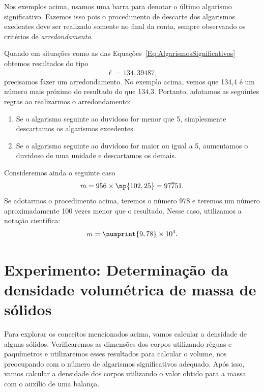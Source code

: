 Nos exemplos acima, usamos uma barra para denotar o último algarismo significativo. Fazemos isso pois o procedimento de descarte dos algarismos exedentes deve ser realizado somente no final da conta, sempre observando os critérios de \emph{arredondamento}.

Quando em situações como as das Equações~\eqref{Eq:AlgarismosSignificativos} obtemos resultados do tipo
\begin{equation}
     \ell = 134{,}\overline{3}9487,
\end{equation}
%
precisamos fazer um arredondamento. No exemplo acima, vemos que 134,4 é um número mais próximo do resultado do que 134,3. Portanto, adotamos as seguintes regras ao realizarmos o arredondamento:
\begin{enumerate}
     \item Se o algarismo seguinte ao duvidoso for menor que 5, simplesmente descartamos os algarismos excedentes.
     \item Se o algarismo seguinte ao duvidoso for maior ou igual a 5, aumentamos o duvidoso de uma unidade e descartamos os demais.
\end{enumerate}

Consideremos ainda o seguinte caso
\begin{equation}
     m = 956 \times \np{102,25} = 97\overline{7}51.
\end{equation}
%
Se adotarmos o procedimento acima, teremos o número 978 e teremos um número aproximadamente 100 vezes menor que o resultado. Nesse caso, utilizamos a notação científica:
\begin{equation}
     m = \numprint{9,78}\times 10^{4}.
\end{equation}

\section{Experimento: Determinação da densidade volumétrica de massa de sólidos}

Para explorar os conceitos mencionados acima, vamos calcular a densidade de alguns sólidos. Verificaremos as dimensões dos corpos utilizando réguas e paquímetros e utilizaremos esses resultados para calcular o volume, nos preocupando com o número de algarismos significativos adequado. Após isso, vamos calcular a densidade dos corpos utilizando o valor obtido para a massa com o auxílio de uma balança.

